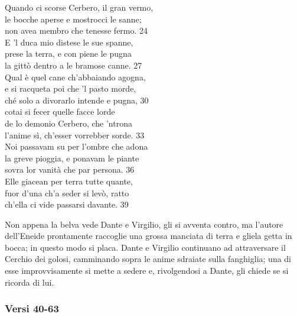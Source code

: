 \documentclass[10pt,a4paper]{article}
\begin{document}
	\begin{estratto}
		Quando ci scorse Cerbero, il gran vermo,\\
		le bocche aperse e mostrocci le sanne;\\
		non avea membro che tenesse fermo.		24\\
		
		E ’l duca mio distese le sue spanne,\\
		prese la terra, e con piene le pugna\\
		la gittò dentro a le bramose canne.		27\\
		
		Qual è quel cane ch’abbaiando agogna,\\
		e si racqueta poi che ’l pasto morde,\\
		ché solo a divorarlo intende e pugna,		30\\
		
		cotai si fecer quelle facce lorde\\
		de lo demonio Cerbero, che ’ntrona\\
		l’anime sì, ch’esser vorrebber sorde.		33\\
		
		Noi passavam su per l’ombre che adona\\
		la greve pioggia, e ponavam le piante\\
		sovra lor vanità che par persona.		36\\
		
		Elle giacean per terra tutte quante,\\
		fuor d’una ch’a seder si levò, ratto\\
		ch’ella ci vide passarsi davante.		39\\
	\end{estratto}
	
	Non appena la belva vede Dante e Virgilio, gli si avventa contro, ma l’autore dell’Eneide prontamente raccoglie una grossa manciata di terra e gliela getta in bocca; in questo modo si placa. Dante e Virgilio continuano ad attraversare il Cerchio dei golosi, camminando sopra le anime sdraiate sulla fanghiglia; una di esse improvvisamente si mette a sedere e, rivolgendosi a Dante, gli chiede se si ricorda di lui.
	
	\subsubsection{Versi 40-63}
	
\end{document}
